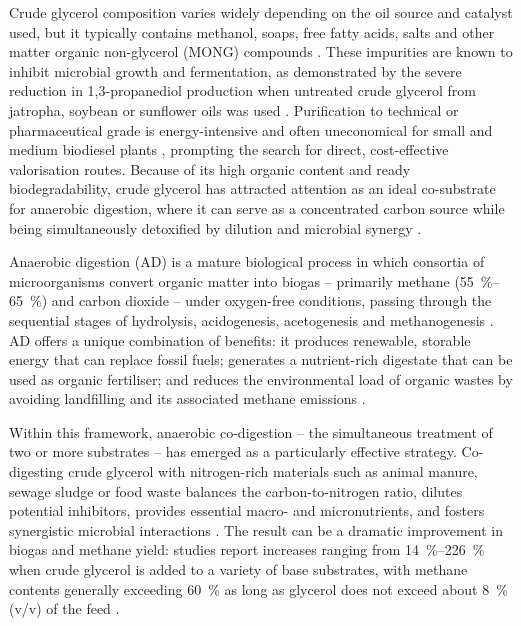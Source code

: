 Crude glycerol composition varies widely depending on the oil source and catalyst used, but it typically contains methanol, soaps, free fatty acids, salts and other matter organic non-glycerol (MONG) compounds \parencite{anand2012, attarbachi2023}. These impurities are known to inhibit microbial growth and fermentation, as demonstrated by the severe reduction in 1,3-propanediol production when untreated crude glycerol from jatropha, soybean or sunflower oils was used \parencite{anand2012}. Purification to technical or pharmaceutical grade is energy-intensive and often uneconomical for small and medium biodiesel plants \parencite{attarbachi2023}, prompting the search for direct, cost-effective valorisation routes. Because of its high organic content and ready biodegradability, crude glycerol has attracted attention as an ideal co-substrate for anaerobic digestion, where it can serve as a concentrated carbon source while being simultaneously detoxified by dilution and microbial synergy \parencite{gebreegziabher2025, tomczak2025}.

Anaerobic digestion (AD) is a mature biological process in which consortia of microorganisms convert organic matter into biogas – primarily methane (\qtyrange{55}{65}{\percent}) and carbon dioxide – under oxygen-free conditions, passing through the sequential stages of hydrolysis, acidogenesis, acetogenesis and methanogenesis \parencite{gebreegziabher2025}. AD offers a unique combination of benefits: it produces renewable, storable energy that can replace fossil fuels; generates a nutrient-rich digestate that can be used as organic fertiliser; and reduces the environmental load of organic wastes by avoiding landfilling and its associated methane emissions \parencite{scherhaufer2018, gebreegziabher2025}.

Within this framework, anaerobic co-digestion – the simultaneous treatment of two or more substrates – has emerged as a particularly effective strategy. Co-digesting crude glycerol with nitrogen-rich materials such as animal manure, sewage sludge or food waste balances the carbon-to-nitrogen ratio, dilutes potential inhibitors, provides essential macro- and micronutrients, and fosters synergistic microbial interactions \parencite{tomczak2025, gebreegziabher2025}. The result can be a dramatic improvement in biogas and methane yield: studies report increases ranging from \qtyrange{14}{226}{\percent} when crude glycerol is added to a variety of base substrates, with methane contents generally exceeding \qty{60}{\percent} as long as glycerol does not exceed about \qty{8}{\percent} (v/v) of the feed \parencite{gebreegziabher2025, tomczak2025}.

